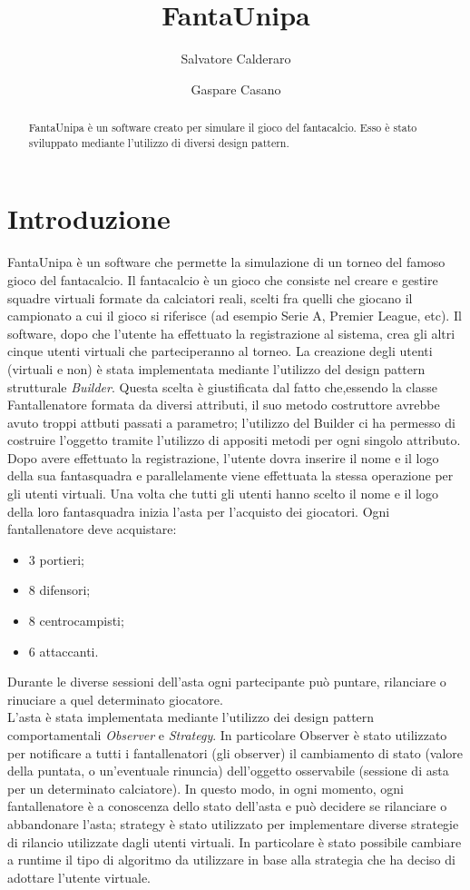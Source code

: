 \documentclass[12pt,a4paper]{article}
\title{FantaUnipa}
\author{Salvatore Calderaro \and Gaspare Casano}
\begin{document}
\maketitle
\newpage
\tableofcontents
\newpage
\begin{abstract}
FantaUnipa è un software creato per simulare il gioco del fantacalcio. Esso è stato sviluppato mediante l'utilizzo di diversi design pattern.
\end{abstract}
\newpage
\section{Introduzione}
FantaUnipa è un software che permette la simulazione di un torneo del famoso gioco del fantacalcio. Il fantacalcio è un gioco che consiste nel creare e gestire squadre virtuali formate da calciatori reali, scelti fra quelli che giocano il campionato a cui il gioco si riferisce (ad esempio Serie A, Premier League, etc). Il software, dopo che l'utente ha effettuato la registrazione al sistema, crea gli altri cinque utenti virtuali che parteciperanno al torneo. La creazione degli utenti (virtuali e non) è stata implementata mediante l'utilizzo del design pattern strutturale \textit{Builder}. Questa scelta è giustificata dal fatto che,essendo la classe Fantallenatore formata da diversi attributi, il suo metodo costruttore avrebbe avuto troppi attbuti passati a parametro; l'utilizzo del Builder ci ha permesso di costruire l'oggetto tramite l'utilizzo di appositi metodi per ogni singolo attributo.\\
Dopo avere effettuato la registrazione, l'utente dovra inserire il nome e il logo della sua fantasquadra e parallelamente viene effettuata la stessa operazione per gli utenti virtuali. Una volta che tutti gli utenti hanno scelto il nome e il logo della loro fantasquadra inizia l'asta per l'acquisto dei giocatori. Ogni fantallenatore deve acquistare:
\begin{itemize}
\item 3 portieri;
\item 8 difensori;
\item 8 centrocampisti;
\item 6 attaccanti.
\end{itemize}
Durante le diverse sessioni dell'asta ogni partecipante può puntare, rilanciare o rinuciare a quel determinato giocatore.\\
L'asta è stata implementata mediante l'utilizzo dei design pattern comportamentali \textit{Observer} e \textit{Strategy}. In particolare Observer è stato utilizzato per notificare a tutti i fantallenatori (gli observer) il cambiamento di stato (valore della puntata, o un'eventuale rinuncia) dell'oggetto osservabile (sessione di asta per un determinato calciatore). In questo modo, in ogni momento, ogni fantallenatore è a conoscenza dello stato dell'asta e può decidere se rilanciare o abbandonare l'asta; strategy è stato utilizzato per implementare diverse strategie di rilancio utilizzate dagli utenti virtuali. In particolare è stato possibile cambiare a runtime il tipo di algoritmo da utilizzare in base alla strategia che ha deciso di adottare l'utente virtuale.\\
\end{document}
